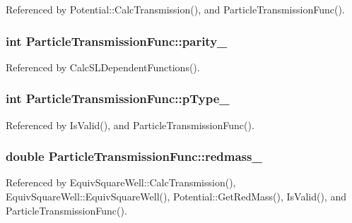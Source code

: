 Referenced by Potential\-::\-Calc\-Transmission(), and Particle\-Transmission\-Func().

\hypertarget{classParticleTransmissionFunc_a3b5220600e09eeaec5bd1059fa1bd6b3}{
\subsubsection[{parity\-\_\-}]{\setlength{\rightskip}{0pt plus 5cm}int Particle\-Transmission\-Func\-::parity\-\_\-\hspace{0.3cm}{\ttfamily [protected]}}}\label{classParticleTransmissionFunc_a3b5220600e09eeaec5bd1059fa1bd6b3}


Referenced by Calc\-S\-L\-Dependent\-Functions().

\hypertarget{classParticleTransmissionFunc_a7d9ec139d40906290a13716e56412e23}{
\subsubsection[{p\-Type\-\_\-}]{\setlength{\rightskip}{0pt plus 5cm}int Particle\-Transmission\-Func\-::p\-Type\-\_\-\hspace{0.3cm}{\ttfamily [protected]}}}\label{classParticleTransmissionFunc_a7d9ec139d40906290a13716e56412e23}


Referenced by Is\-Valid(), and Particle\-Transmission\-Func().

\hypertarget{classParticleTransmissionFunc_aa044907ae1f3827d8602fc33f4b0e92c}{
\subsubsection[{redmass\-\_\-}]{\setlength{\rightskip}{0pt plus 5cm}double Particle\-Transmission\-Func\-::redmass\-\_\-\hspace{0.3cm}{\ttfamily [protected]}}}\label{classParticleTransmissionFunc_aa044907ae1f3827d8602fc33f4b0e92c}


Referenced by Equiv\-Square\-Well\-::\-Calc\-Transmission(), Equiv\-Square\-Well\-::\-Equiv\-Square\-Well(), Potential\-::\-Get\-Red\-Mass(), Is\-Valid(), and Particle\-Transmission\-Func().

